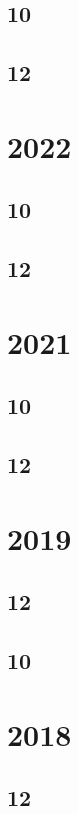 \documentclass[11pt]{book}
\begin{document}
\subsection{10}

\subsection{12}                                                                                                  

\section{2022}
\subsection{10}

\subsection{12}

\section{2021}
\subsection{10}

\subsection{12}

\section{2019}
\subsection{12}


\subsection{10}

\section{2018}
\subsection{12}
  
 
\end{document}
